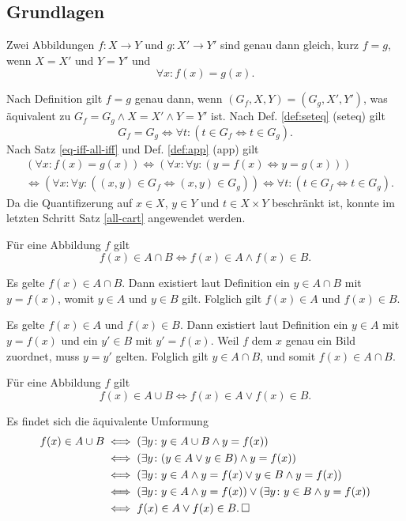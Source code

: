 \subsection{Grundlagen}
\begin{Satz}%
\label{feq}
Zwei Abbildungen $f\colon X\to Y$ und $g\colon X'\to Y'$ sind genau
dann gleich, kurz $f=g$, wenn $X=X'$ und $Y=Y'$ und%
\[\forall x\colon f(x)=g(x).\]
\end{Satz}

\begin{Beweis}
Nach Definition gilt $f=g$ genau dann, wenn $(G_f,X,Y)=(G_g,X',Y')$,
was äquivalent zu $G_f=G_g\land X=X'\land Y=Y'$ ist. Nach Def.
\ref{def:seteq} (seteq) gilt%
\[G_f=G_g\iff \forall t\colon (t\in G_f\Leftrightarrow t\in G_g).\]
Nach Satz \ref{eq-iff-all-iff} und Def. \ref{def:app} (app) gilt
\begin{align*}
&(\forall x\colon f(x)=g(x)) \iff (\forall x\colon\forall y\colon (y=f(x)\Leftrightarrow y=g(x)))\\
&\iff (\forall x\colon\forall y\colon((x,y)\in G_f\Leftrightarrow (x,y)\in G_g))
\iff \forall t\colon (t\in G_f\Leftrightarrow t\in G_g).
\end{align*}
Da die Quantifizerung auf $x\in X$, $y\in Y$ und $t\in X\times Y$
beschränkt ist, konnte im letzten Schritt Satz \ref{all-cart}
angewendet werden.\;\qedsymbol
\end{Beweis}

\begin{Satz} Für eine Abbildung $f$ gilt
\[f(x)\in A\cap B\iff f(x)\in A\land f(x)\in B.\]
\end{Satz}
\begin{Beweis}
Es gelte $f(x)\in A\cap B$. Dann existiert laut Definition ein
$y\in A\cap B$ mit $y=f(x)$, womit $y\in A$ und $y\in B$ gilt.
Folglich gilt $f(x)\in A$ und $f(x)\in B$.

Es gelte $f(x)\in A$ und $f(x)\in B$. Dann existiert laut Definition
ein $y\in A$ mit $y=f(x)$ und ein $y'\in B$ mit $y'=f(x)$.
Weil $f$ dem $x$ genau ein Bild zuordnet, muss $y=y'$ gelten.
Folglich gilt $y\in A\cap B$, und somit $f(x)\in A\cap B$.\,\qedsymbol
\end{Beweis}

\begin{Satz} Für eine Abbildung $f$ gilt
\[f(x)\in A\cup B\iff f(x)\in A\lor f(x)\in B.\]
\end{Satz}
\begin{Beweis} Es findet sich die äquivalente Umformung
\begin{align*}
f(x)\in A\cup B &\iff (\exists y\colon y\in A\cup B\land y=f(x))\\
&\iff (\exists y\colon (y\in A\lor y\in B)\land y = f(x))\\
&\iff (\exists y\colon y\in A\land y=f(x)\lor y\in B\land y = f(x))\\
&\iff (\exists y\colon y\in A\land y=f(x))\lor (\exists y\colon y\in B\land y = f(x))\\
&\iff f(x)\in A\lor f(x)\in B.\,\square
\end{align*}
\end{Beweis}

